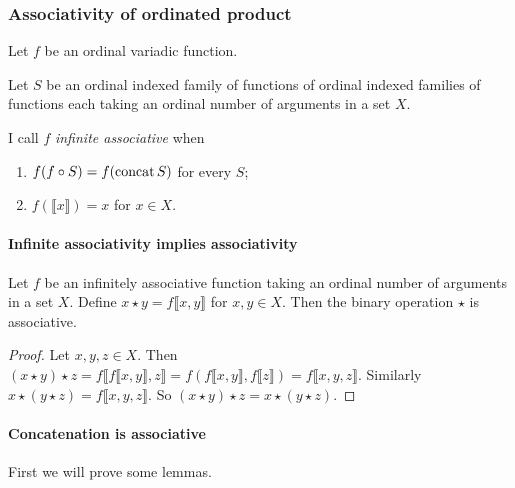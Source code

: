 \subsubsection{Associativity of ordinated product}

Let $f$ be an ordinal variadic function.

Let $S$ be an ordinal indexed family of functions of ordinal indexed
families of functions each taking an ordinal number of arguments in
a set $X$.

I call $f$ \emph{infinite associative}
when
\begin{enumerate}
\item $f(f\circ S)=f(\operatorname{concat} S)$ for every $S$;
\item $f(\llbracket x\rrbracket)=x$ for $x\in X$.
\end{enumerate}

\paragraph{Infinite associativity implies associativity}
\begin{prop}
Let $f$ be an infinitely associative function taking an ordinal number
of arguments in a set $X$. Define $x\star y=f\llbracket x,y\rrbracket$
for $x,y\in X$. Then the binary operation $\star$ is associative.\end{prop}
\begin{proof}
Let $x,y,z\in X$. Then $(x\star y)\star z=f\llbracket f\llbracket x,y\rrbracket,z\rrbracket=f(f\llbracket x,y\rrbracket,f\llbracket z\rrbracket)=f\llbracket x,y,z\rrbracket$.
Similarly $x\star(y\star z)=f\llbracket x,y,z\rrbracket$. So $(x\star y)\star z=x\star(y\star z)$.
\end{proof}

\paragraph{Concatenation is associative}

First we will prove some lemmas.

